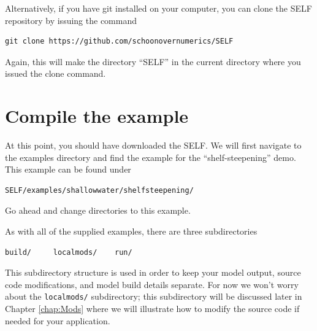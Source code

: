 \documentclass{softwaremanual}
\begin{document}
Alternatively, if you have git installed on your computer, you can clone the SELF repository by issuing the command
\begin{center}
\begin{verbatim}
git clone https://github.com/schoonovernumerics/SELF
\end{verbatim}
\end{center}
Again, this will make the directory ``SELF'' in the current directory where you issued the clone command. 

\section{Compile the example}
At this point, you should have downloaded the SELF. We will first navigate to the examples directory and find the example for the ``shelf-steepening'' demo. This example can be found under
\begin{center}
\begin{verbatim}
SELF/examples/shallowwater/shelfsteepening/
\end{verbatim}
\end{center}
Go ahead and change directories to this example.

As with all of the supplied examples, there are three subdirectories
\begin{center}
\begin{verbatim}
build/     localmods/    run/
\end{verbatim}
\end{center}
This subdirectory structure is used in order to keep your model output, source code modifications, and model build details separate. For now we won't worry about the \texttt{localmods/} subdirectory; this subdirectory will be discussed later in Chapter \ref{chap:Mods} where we will illustrate how to modify the source code if needed for your application.
\end{document}
